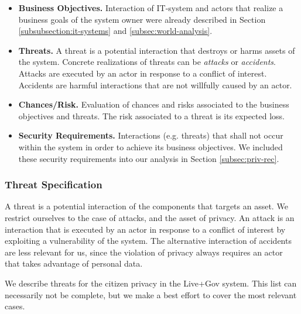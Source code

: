 \documentclass[runningheads,a4paper]{llncs}
\begin{document}
\begin{itemize}

	\item \textbf{Business Objectives.}
	Interaction of IT-system and actors that realize a business goals of the system owner were already described in Section \ref{subsubsection:it-systems} and \ref{subsec:world-analysis}.

	\item \textbf{Threats.}
	A threat is a potential interaction that destroys or harms assets of the system.
	Concrete realizations of threats can be \emph{attacks} or \emph{accidents}.
	Attacks are executed by an actor in response to a conflict of interest.
	Accidents are harmful interactions that are not willfully caused by an actor.
	
	\item \textbf{Chances/Risk.}
	Evaluation of chances and risks associated to the business objectives and threats. The risk associated to a threat is its expected loss.

	\item \textbf{Security Requirements.}
	Interactions (e.g. threats) that shall not occur within the system in order to achieve its business objectives.  We included these security requirements into our analysis in Section \ref{subsec:priv-rec}.
		
\end{itemize}


\subsubsection{Threat Specification}

A threat is a potential interaction of the components that targets an asset.
We restrict ourselves to the case of attacks, and the asset of privacy.
An attack is an interaction that is executed by an actor in response to a conflict of interest by exploiting a vulnerability of the system.
The alternative interaction of accidents are less relevant for us, since the violation of privacy always requires an actor that takes advantage of personal data.

We describe threats for the citizen privacy in the Live+Gov system.
This list can necessarily not be complete, but we make a best effort to cover the most relevant cases.
\end{document}
